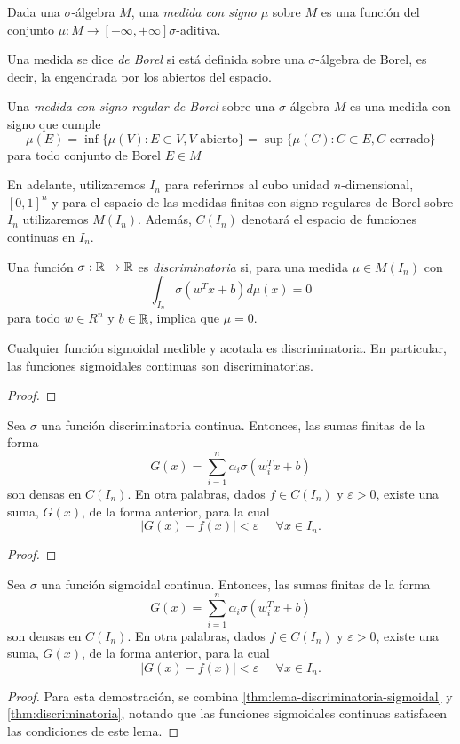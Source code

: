 \begin{definicion}
Dada una $\sigma$-álgebra $M$, una \emph{medida con signo $\mu$} sobre $M$ es una función del conjunto $\mu: M\to [-\infty,+\infty] \sigma$-aditiva.
\end{definicion}
\begin{definicion}
Una medida se dice \emph{de Borel} si está definida sobre una $\sigma$-álgebra de Borel, es decir, la engendrada por los abiertos del espacio.
\end{definicion}
\begin{definicion}
Una \emph{medida con signo regular de Borel} sobre una $\sigma$-álgebra $M$ es una medida con signo que cumple $$\mu(E)=\inf\{\mu(V): E\subset V, V \text{ abierto}\}=\sup\{\mu(C): C\subset E, C\text{ cerrado}\}$$
para todo conjunto de Borel $E\in M$
\end{definicion}
En adelante, utilizaremos $I_n$ para referirnos al cubo unidad $n$-dimensional, $[0,1]^n$ y para el espacio de las medidas finitas con signo regulares de Borel sobre $I_n$ utilizaremos $M(I_n)$. Además, $C(I_n)$ denotará el espacio de funciones continuas en $I_n$.

\begin{definicion}\label{def:discriminatoria}
Una función $\sigma : \mathbb{R} \to \mathbb{R}$ es \emph{discriminatoria} si, para una medida $\mu \in M(I_n)$ con $$\int_{I_n} \sigma(w^Tx+b) d\mu(x)=0$$ para todo $ w\in R^n$ y $b\in\mathbb{R}$, implica que $\mu=0$.
\end{definicion}

\begin{lema}\label{thm:lema-discriminatoria-sigmoidal}
Cualquier función sigmoidal medible y acotada es discriminatoria. En particular, las funciones sigmoidales continuas son discriminatorias.
\end{lema}
\begin{proof}
\end{proof}

\begin{teorema}\label{thm:discriminatoria}
Sea $\sigma$ una función discriminatoria continua. Entonces, las sumas finitas de la forma $$G(x)=\sum_{i=1}^n \alpha_i \sigma(w_i^Tx+b)$$ son densas en $C(I_n)$. En otra palabras, dados $f\in C(I_n)$ y $\varepsilon>0$, existe una suma, $G(x)$, de la forma anterior, para la cual $$|G(x)-f(x)|<\varepsilon \;\;\;\;\; \forall x \in I_n.$$
\end{teorema}
\begin{proof}
\end{proof}
\begin{teorema}\label{thm:sigmoidal}
Sea $\sigma$ una función sigmoidal continua. Entonces, las sumas finitas de la forma $$G(x)=\sum_{i=1}^n \alpha_i \sigma(w_i^Tx+b)$$ son densas en $C(I_n)$. En otra palabras, dados $f\in C(I_n)$ y $\varepsilon>0$, existe una suma, $G(x)$, de la forma anterior, para la cual $$|G(x)-f(x)|<\varepsilon \;\;\;\;\; \forall x \in I_n.$$
\end{teorema}
\begin{proof}
Para esta demostración, se combina \autoref{thm:lema-discriminatoria-sigmoidal} y \autoref{thm:discriminatoria}, notando que las funciones sigmoidales continuas satisfacen las condiciones de este lema.
\end{proof}

